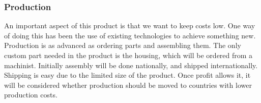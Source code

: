 \subsubsection{Production}
An important aspect of this product is that we want to keep costs low. One way of doing this has been the use of existing technologies to achieve something new. Production is as advanced as ordering parts and assembling them. The only custom part needed in the product is the housing, which will be ordered from a machinist. Initially assembly will be done nationally, and shipped internationally. Shipping is easy due to the limited size of the product. Once profit allows it, it will be considered whether production should be moved to countries with lower production costs.

